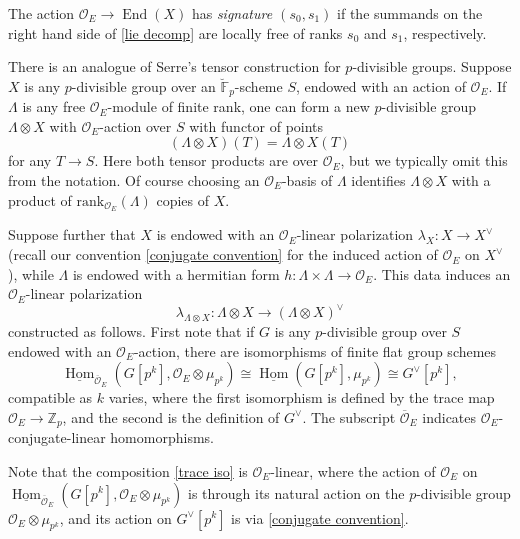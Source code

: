 \documentclass[11pt]{alggeom}
\newcommand{\iso}{\cong}
\newcommand{\Z}{\mathbb Z}
\newcommand{\F}{\mathbb F}
\newcommand{\co}{\mathcal O}
\DeclareMathOperator{\Hom}{Hom}
\DeclareMathOperator{\End}{End}
\begin{document}
\begin{definition}
The action $\co_E \to \End(X)$ has \emph{signature $(s_0,s_1)$} if  the summands on the right hand side of \eqref{lie decomp} are  locally free of ranks $s_0$ and $s_1$, respectively.
\end{definition}




There is an analogue of Serre's tensor construction for $p$-divisible groups.  
Suppose $X$ is any $p$-divisible group over an $\breve{\F}_p$-scheme $S$, endowed with an action of $\co_E$.  If $\Lambda$ is any free $\co_E$-module of finite rank, one can form a new $p$-divisible group $\Lambda \otimes X$ with $\co_E$-action over $S$ with functor of points 
\[
(\Lambda \otimes X)(T) =  \Lambda  \otimes   X(T) 
\] 
for any $T\to S$.  
Here both tensor products are over $\co_E$, but we typically  omit this from the notation.
Of course choosing an $\co_E$-basis of $\Lambda$ identifies $ \Lambda \otimes X$ with a product of $\mathrm{rank}_{\co_E}(\Lambda)$ copies of $X$.



Suppose further that $X$ is endowed with an $\co_E$-linear polarization $\lambda_X :X \to X^\vee$ (recall our convention  \eqref{conjugate convention} for the induced action of $\co_E$ on $X^\vee$), while $\Lambda$ is endowed with a hermitian form $h : \Lambda \times \Lambda \to \co_E$. 
This data induces an $\co_E$-linear polarization 
\[
\lambda_{ \Lambda  \otimes X} :  \Lambda \otimes  X \to (  \Lambda\otimes X)^\vee
\]
constructed as follows.
First note that if $G$ is any $p$-divisible group over $S$ endowed with an $\co_E$-action, there are isomorphisms of finite flat group schemes
\begin{equation}\label{trace iso}
\underline{\Hom}_{\overline{\co}_E}(G[p^k] , \co_E \otimes \mu_{p^k})
\iso \underline{\Hom}(G[p^k] ,  \mu_{p^k}) \iso G^\vee[p^k], 
\end{equation}
compatible as $k$ varies, where the  first isomorphism is defined by the trace map $\co_E \to \Z_p$, and the second is the definition of $G^\vee$.  The subscript $\overline{\co}_E$ indicates  $\co_E$-conjugate-linear homomorphisms. 

Note that the composition \eqref{trace iso} is $\co_E$-linear, where the action of $\co_E$ on $\underline{\Hom}_{\overline{\co}_E}(G[p^k] , \co_E \otimes \mu_{p^k})$ is through its natural action on the $p$-divisible group $\co_E \otimes \mu_{p^k}$, and its action on $G^\vee[p^k]$ is via \eqref{conjugate convention}.
\end{document}
